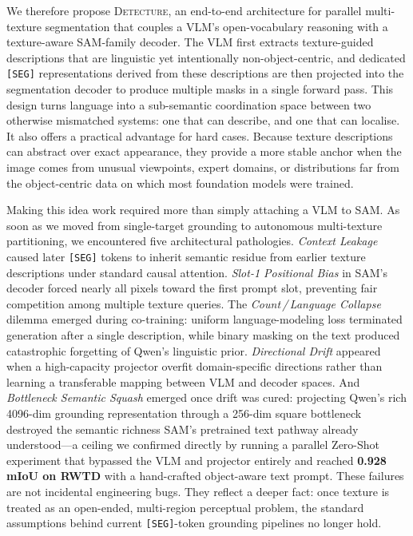 \documentclass{article}
\begin{document}
We therefore propose \textsc{Detecture}, an end-to-end architecture for parallel multi-texture segmentation that couples a VLM's open-vocabulary reasoning with a texture-aware SAM-family decoder. The VLM first extracts texture-guided descriptions that are linguistic yet intentionally non-object-centric, and dedicated \texttt{[SEG]} representations derived from these descriptions are then projected into the segmentation decoder to produce multiple masks in a single forward pass. This design turns language into a sub-semantic coordination space between two otherwise mismatched systems: one that can describe, and one that can localise. It also offers a practical advantage for hard cases. Because texture descriptions can abstract over exact appearance, they provide a more stable anchor when the image comes from unusual viewpoints, expert domains, or distributions far from the object-centric data on which most foundation models were trained.

Making this idea work required more than simply attaching a VLM to SAM. As soon as we moved from single-target grounding to autonomous multi-texture partitioning, we encountered five architectural pathologies. \emph{Context Leakage} caused later \texttt{[SEG]} tokens to inherit semantic residue from earlier texture descriptions under standard causal attention. \emph{Slot-1 Positional Bias} in SAM's decoder forced nearly all pixels toward the first prompt slot, preventing fair competition among multiple texture queries. The \emph{Count\,/\,Language Collapse} dilemma emerged during co-training: uniform language-modeling loss terminated generation after a single description, while binary masking on the text produced catastrophic forgetting of Qwen's linguistic prior. \emph{Directional Drift} appeared when a high-capacity projector overfit domain-specific directions rather than learning a transferable mapping between VLM and decoder spaces. And \emph{Bottleneck Semantic Squash} emerged once drift was cured: projecting Qwen's rich 4096-dim grounding representation through a 256-dim square bottleneck destroyed the semantic richness SAM's pretrained text pathway already understood---a ceiling we confirmed directly by running a parallel Zero-Shot experiment that bypassed the VLM and projector entirely and reached \textbf{0.928 mIoU on RWTD} with a hand-crafted object-aware text prompt. These failures are not incidental engineering bugs. They reflect a deeper fact: once texture is treated as an open-ended, multi-region perceptual problem, the standard assumptions behind current \texttt{[SEG]}-token grounding pipelines no longer hold.
\end{document}
